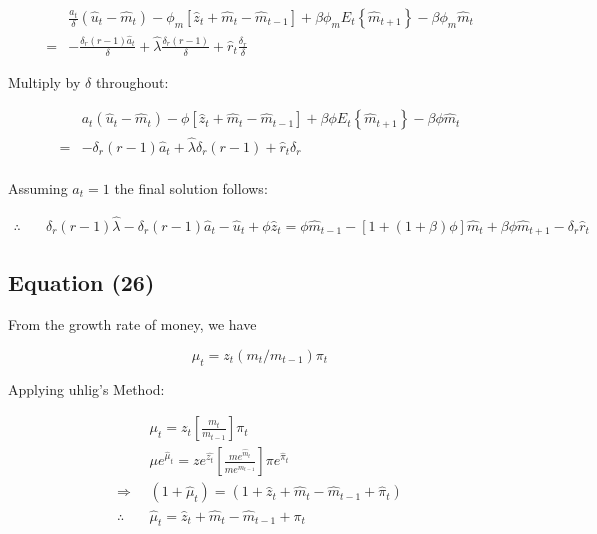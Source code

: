 \documentclass[11pt,preprint, authoryear]{elsarticle}
\numberwithin{equation}{section}
\numberwithin{figure}{section}
\numberwithin{table}{section}
\begin{document}
\[\begin{aligned} &\frac{a_{t}}{\delta} \left( \hat{u}_{t}-\hat{m}_{t} \right) - \phi_m \left[\hat{z}_{t}+\hat{m}_{t}-\hat{m}_{t-1}\right] + \beta \phi_{m} E_{t}\left\{\hat{m}_{t+1}\right\} - \beta \phi_m \hat{m}_{t} \\
= &  -\frac{\delta_r(r-1) \hat{a}_t}{\delta} + \hat{\lambda}\frac{\delta_r (r-1)}{\delta} +\hat{r}_t \frac{\delta_r}{\delta}
\end{aligned}\]

Multiply by \(\delta\) throughout:

\[\begin{aligned} & a_t \left( \hat{u}_{t}-\hat{m}_{t} \right) - \phi \left[\hat{z}_{t} + \hat{m}_{t}-\hat{m}_{t-1}\right] + \beta \phi E_{t}\left\{\hat{m}_{t+1}\right\} - \beta \phi \hat{m}_{t} \\
=&  -\delta_r(r-1) \hat{a}_t + \hat{\lambda}\delta_r (r-1) +\hat{r}_t \delta_r \\\end{aligned}\]

Assuming \(a_t = 1\) the final solution follows:

\[\begin{aligned}\therefore \quad & \delta_r (r-1) \hat{\lambda} - \delta_r(r-1) \hat{a}_t -\hat{u}_{t} +\phi \hat{z}_{t}
= \phi \hat{m}_{t-1}-[1+(1+\beta) \phi] \hat{m}_{t}+\beta \phi \hat{m}_{t+1}-\delta_{r} \hat{r}_{t}
\end{aligned}\]

\hypertarget{equation-26}{%
\subsection{Equation (26)}\label{equation-26}}

From the growth rate of money, we have

\[\mu_{t}=z_{t}\left(m_{t} / m_{t-1}\right) \pi_{t}\]

Applying uhlig's Method:

\[\begin{aligned}
&\mu_{t} =z_{t}\left[\frac{m_{t}}{m_{t-1}}\right] \pi_{t} \\
&\mu e^{\hat{\mu}_{t}}=z e^{\hat{z_{t}}}\left[\frac{m e^{\hat{m}_{t}}}{m e^{\hat{m}_{t-1}}}\right] \pi e^{\hat{\pi}_{t}} \\
\Rightarrow & \left(1+\hat{\mu}_{t}\right) =\left(1+\hat{z}_{t}+\hat{m}_{t}-\hat{m}_{t-1}+\hat{\pi}_{t}\right) \\
\therefore \quad & \hat{\mu}_{t} =\hat{z}_{t}+\hat{m}_{t}-\hat{m}_{t-1}+\pi_{t}
\end{aligned}\]
\end{document}
